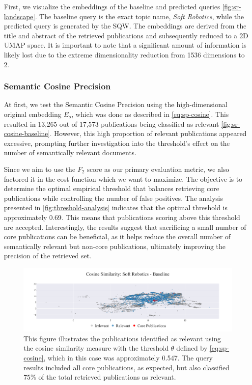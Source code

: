 First, we visualize the embeddings of the baseline and predicted queries \autoref{fig:sr-landscape}. The baseline query is the exact topic name, \textit{Soft Robotics}, while the predicted query is generated by the SQW. The embeddings are derived from the title and abstract of the retrieved publications and subsequently reduced to a 2D UMAP \autocite{mcinnes2020umap} space. It is important to note that a significant amount of information is likely lost due to the extreme dimensionality reduction from 1536 dimensions to 2.

\subsubsection{Semantic Cosine Precision}

At first, we test the Semantic Cosine Precision using the high-dimensional original embedding $E_o$, which was done as described in \autoref{eq:sp-cosine}. This resulted in 13,265 out of 17,573 publications being classified as relevant \autoref{fig:sr-cosine-baseline}. However, this high proportion of relevant publications appeared excessive, prompting further investigation into the threshold's effect on the number of semantically relevant documents.

Since we aim to use the $F_2$ score as our primary evaluation metric, we also factored it in the cost function which we want to maximize. The objective is to determine the optimal empirical threshold that balances retrieving core publications while controlling the number of false positives. The analysis presented in \autoref{fig:threshold-analysis} indicates that the optimal threshold is approximately 0.69. This means that publications scoring above this threshold are accepted. Interestingly, the results suggest that sacrificing a small number of core publications can be beneficial, as it helps reduce the overall number of semantically relevant but non-core publications, ultimately improving the precision of the retrieved set.

\begin{figure}[!ht]
	\hspace*{-1cm}	
	\includegraphics[scale=0.45]{pics/sr-cosine-baseline.pdf}
	\caption[Semantic Cosine Similarity: Soft Robotics]{This figure illustrates the publications identified as relevant using the cosine similarity measure with the threshold $\theta$ defined by \autoref{eq:sp-cosine}, which in this case was approximately 0.547. The query results included all core publications, as expected, but also classified 75\% of the total retrieved publications as relevant.}\label{fig:sr-cosine-baseline}
\end{figure}


